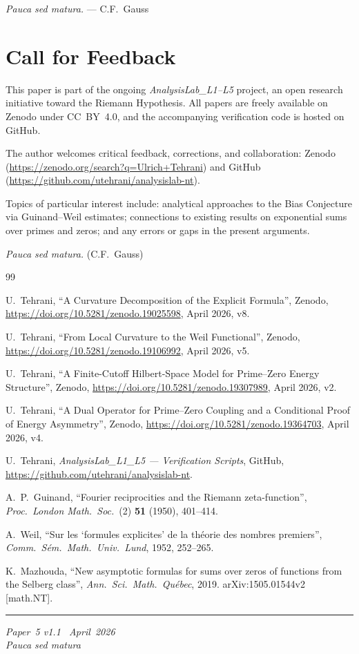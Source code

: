 \documentclass[11pt]{article}
\begin{document}
\emph{Pauca sed matura.} --- C.F.~Gauss

\section*{Call for Feedback}

This paper is part of the ongoing \textit{AnalysisLab\_L1--L5} project,
an open research initiative toward the Riemann Hypothesis.
All papers are freely available on Zenodo under CC~BY~4.0,
and the accompanying verification code is hosted on GitHub.

The author welcomes critical feedback, corrections, and collaboration:
Zenodo (\url{https://zenodo.org/search?q=Ulrich+Tehrani})
and GitHub (\url{https://github.com/utehrani/analysislab-nt}).

Topics of particular interest include: analytical approaches to the
Bias Conjecture via Guinand--Weil estimates; connections to existing
results on exponential sums over primes and zeros; and any errors or
gaps in the present arguments.

\noindent\textit{Pauca sed matura.} (C.F.\ Gauss)

\begin{thebibliography}{99}

U.~Tehrani,
``A Curvature Decomposition of the Explicit Formula'',
Zenodo, \url{https://doi.org/10.5281/zenodo.19025598},
April 2026, v8.

U.~Tehrani,
``From Local Curvature to the Weil Functional'',
Zenodo, \url{https://doi.org/10.5281/zenodo.19106992},
April 2026, v5.

U.~Tehrani,
``A Finite-Cutoff Hilbert-Space Model
for Prime--Zero Energy Structure'',
Zenodo, \url{https://doi.org/10.5281/zenodo.19307989},
April 2026, v2.

U.~Tehrani,
``A Dual Operator for Prime--Zero Coupling
and a Conditional Proof of Energy Asymmetry'',
Zenodo, \url{https://doi.org/10.5281/zenodo.19364703},
April 2026, v4.

U.~Tehrani,
\emph{AnalysisLab\_L1\_L5 --- Verification Scripts},
GitHub, \url{https://github.com/utehrani/analysislab-nt}.

A.~P.~Guinand,
``Fourier reciprocities and the Riemann zeta-function'',
\emph{Proc.\ London Math.\ Soc.}\ (2) \textbf{51} (1950), 401--414.

A.~Weil,
``Sur les `formules explicites' de la th\'eorie des nombres premiers'',
\emph{Comm.\ S\'em.\ Math.\ Univ.\ Lund}, 1952, 252--265.

K.~Mazhouda,
``New asymptotic formulas for sums over zeros of functions
from the Selberg class'',
\emph{Ann.\ Sci.\ Math.\ Qu\'ebec}, 2019.
arXiv:1505.01544v2 [math.NT].

\end{thebibliography}

\bigskip\noindent\rule{\linewidth}{0.4pt}\smallskip
\noindent\small
\emph{Paper~5 v1.1 \textperiodcentered\ April~2026}\\
\emph{Pauca sed matura}
\end{document}

